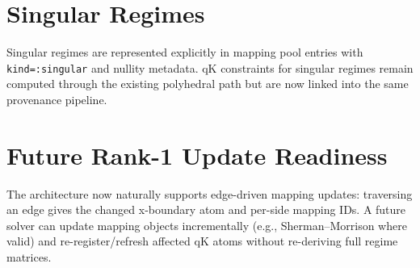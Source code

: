 \documentclass[11pt]{article}
\begin{document}
\section{Singular Regimes}
Singular regimes are represented explicitly in mapping pool entries with \texttt{kind=:singular} and nullity metadata. qK constraints for singular regimes remain computed through the existing polyhedral path but are now linked into the same provenance pipeline.

\section{Future Rank-1 Update Readiness}
The architecture now naturally supports edge-driven mapping updates: traversing an edge gives the changed x-boundary atom and per-side mapping IDs. A future solver can update mapping objects incrementally (e.g., Sherman--Morrison where valid) and re-register/refresh affected qK atoms without re-deriving full regime matrices.
\end{document}

